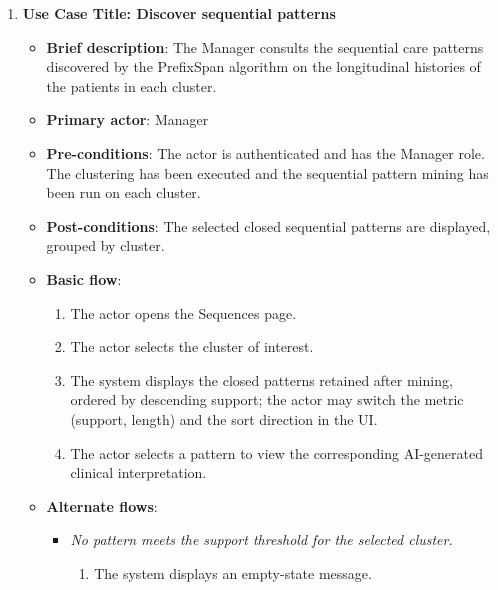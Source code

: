 \begin{enumerate}

\item \textbf{Use Case Title: Discover sequential patterns}
\begin{itemize}
    \item \textbf{Brief description}: The Manager consults the sequential care patterns discovered by the PrefixSpan algorithm on the longitudinal histories of the patients in each cluster.
    \item \textbf{Primary actor}: Manager
    \item \textbf{Pre-conditions}: The actor is authenticated and has the Manager role. The clustering has been executed and the sequential pattern mining has been run on each cluster.
    \item \textbf{Post-conditions}: The selected closed sequential patterns are displayed, grouped by cluster.
    \item \textbf{Basic flow}:
    \begin{enumerate}
        \item The actor opens the Sequences page.
        \item The actor selects the cluster of interest.
        \item The system displays the closed patterns retained after mining, ordered by descending support; the actor may switch the metric (support, length) and the sort direction in the UI.
        \item The actor selects a pattern to view the corresponding AI-generated clinical interpretation.
    \end{enumerate}
    \item \textbf{Alternate flows}:
    \begin{itemize}
        \item[3a.] \textit{No pattern meets the support threshold for the selected cluster.}
        \begin{enumerate}
            \item The system displays an empty-state message.
        \end{enumerate}
    \end{itemize}
\end{itemize}

\vspace{0.5em}


\end{enumerate}
